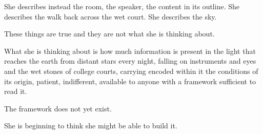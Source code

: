 She describes instead the room, the speaker, the
content in its outline. She describes the walk back
across the wet court. She describes the sky.

These things are true and they are not what she
is thinking about.

What she is thinking about is how much information
is present in the light that reaches the earth from
distant stars every night, falling on instruments
and eyes and the wet stones of college courts,
carrying encoded within it the conditions of its
origin, patient, indifferent, available to anyone
with a framework sufficient to read it.

The framework does not yet exist.

She is beginning to think she might be able to
build it.

